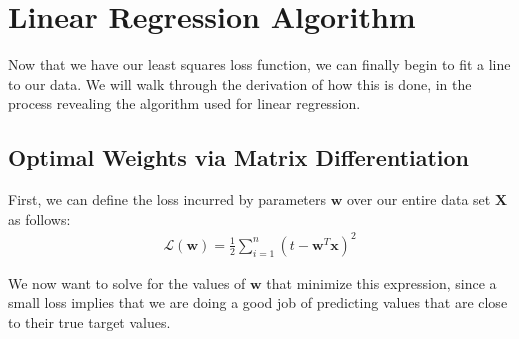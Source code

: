 \section{Linear Regression Algorithm}
Now that we have our least squares loss function, we can finally begin to fit a line to our data. We will walk through the derivation of how this is done, in the process revealing the algorithm used for linear regression.

\subsection{Optimal Weights via Matrix Differentiation}
First, we can define the loss incurred by parameters $\textbf{w}$ over our entire data set $\textbf{X}$ as follows:
\begin{align}
    \mathcal{L}(\textbf{w}) = \frac{1}{2} \sum_{i=1}^{n} (t - \textbf{w}^{T}\textbf{x})^2
\end{align}


We now want to solve for the values of $\textbf{w}$ that minimize this expression, since a small loss implies that we are doing a good job of predicting values that are close to their true target values.


